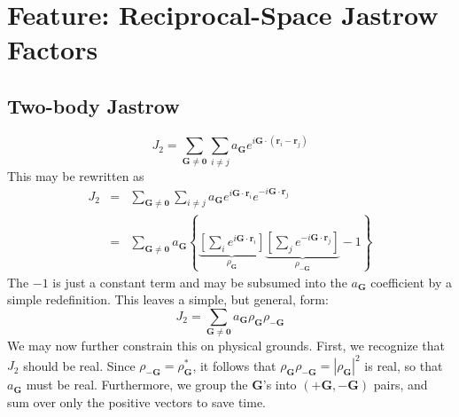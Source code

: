 \newpage
\section{Feature: Reciprocal-Space Jastrow Factors}


\renewcommand{\vG}{\mathbf{G}}
\renewcommand{\vr}{\mathbf{r}}
\renewcommand{\vI}{\mathbf{I}}

\subsection{Two-body Jastrow}
\begin{equation}
J_2 = \sum_{\vG\neq \mathbf{0}}\sum_{i\neq j} a_\vG e^{i\vG\cdot(\vr_i-\vr_j)}
\end{equation}
This may be rewritten as
\begin{eqnarray}
J_2 & = & \sum_{\vG\neq \mathbf{0}}\sum_{i\neq j} a_\vG e^{i\vG\cdot\vr_i}e^{-i\vG\cdot\vr_j} \\
& = & \sum_{\vG\neq \mathbf{0}} a_\vG \left\{
\underbrace{\left[\sum_i e^{i\vG\cdot\vr_i} \right]}_{\rho_\vG}
\underbrace{\left[\sum_j e^{-i\vG\cdot\vr_j} \right]}_{\rho_{-\vG}}  -1 \right\}
\end{eqnarray}
The $-1$ is just a constant term and may be subsumed into the $a_\vG$
coefficient by a simple redefinition.  This leaves a simple, but
general, form:
\begin{equation}
J_2 = \sum_{\vG\neq\mathbf{0}} a_\vG \rho_\vG \rho_{-\vG}
\end{equation}
We may now further constrain this on physical grounds.  First, we
recognize that $J_2$ should be real.  Since $\rho_{-\vG} =
\rho_\vG^*$, it follows that $\rho_{\vG}\rho_{-\vG} = |\rho_\vG|^2$ is
real, so that $a_\vG$ must be real.  Furthermore, we group the $\vG$'s
into $(+\vG, -\vG)$ pairs, and sum over only the positive vectors to
save time.

